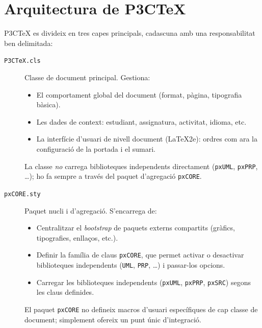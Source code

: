 \documentclass[EN]{P3CTeX}
\begin{document}
\section*{Arquitectura de P3CTeX}

P3CTeX es divideix en tres capes principals, cadascuna amb una
responsabilitat ben delimitada:

\begin{description}
  \item[\texttt{P3CTeX.cls}] Classe de document principal. Gestiona:
    \begin{itemize}
      \item El comportament global del document (format, pàgina,
            tipografia bàsica).
      \item Les dades de context: estudiant, assignatura, activitat,
            idioma, etc.
      \item La interfície d'usuari de nivell document (\LaTeX2e): ordres
            com ara la configuració de la portada i el sumari.
    \end{itemize}
    La classe \emph{no} carrega biblioteques independents directament
    (\texttt{pxUML}, \texttt{pxPRP}, \dots); ho fa sempre a través del
    paquet d'agregació \texttt{pxCORE}.

  \item[\texttt{pxCORE.sty}] Paquet nucli i d'agregació. S'encarrega de:
    \begin{itemize}
      \item Centralitzar el \emph{bootstrap} de paquets externs
            compartits (gràfics, tipografies, enllaços, etc.).
      \item Definir la família de claus \texttt{pxCORE}, que permet
            activar o desactivar biblioteques independents
            (\texttt{UML}, \texttt{PRP}, \dots) i passar-los opcions.
      \item Carregar les biblioteques independents (\texttt{pxUML},
            \texttt{pxPRP}, \texttt{pxSRC}) segons les
            claus definides.
    \end{itemize}
    El paquet \texttt{pxCORE} no defineix macros d'usuari
    específiques de cap classe de document; simplement ofereix un
    punt únic d'integració.


\end{description}
\end{document}

